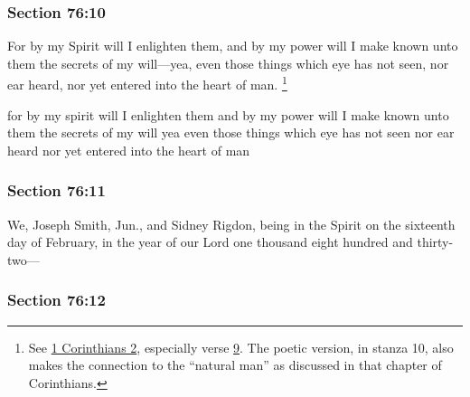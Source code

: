 	\subsubsection{Section 76:10} %
		\label{DC76-10}

		For by my Spirit will I enlighten them, and by my power will I make known unto them the secrets of my will---yea, even those things which eye has not seen, nor ear heard, nor yet entered into the heart of man.%
			\footnote{%
				\label{DC76-10-heart}%
				See \hyperref[1CORINTHIANS-2]{1 Corinthians 2}, especially verse \hyperref[1CORINTHIANS-2-9]{9}. The poetic version, in stanza 10, also makes the connection to the ``natural man'' as discussed in that chapter of Corinthians.
				} 

		\begin{framed}
		\scriptsize
			\begin{compactdesc}
				\item[JSP] for by my spirit will I enlighten them and by my power will I make known unto them the secrets of my will yea even those things which eye has not seen nor ear heard nor yet entered into the heart of man
			\end{compactdesc}
		\end{framed}

	\subsubsection{Section 76:11} %
		\label{DC76-11}

		We, Joseph Smith, Jun., and Sidney Rigdon, being in the Spirit on the sixteenth day of February, in the year of our Lord one thousand eight hundred and thirty-two---


	\subsubsection{Section 76:12} %
		\label{DC76-12}

